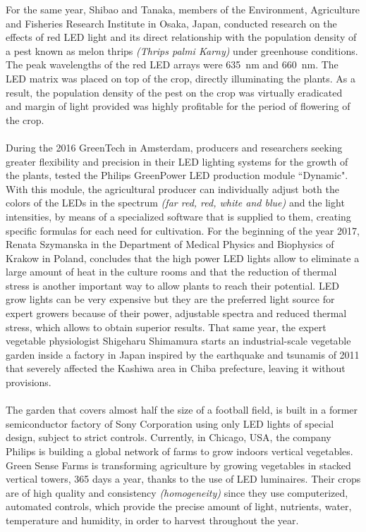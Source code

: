 \documentclass[letterpaper,12pt,twoside]{articleingud}
\begin{document}
For the same year, Shibao and Tanaka, members of the Environment, Agriculture and Fisheries Research Institute in Osaka, Japan, conducted research on the effects of red LED light and its direct relationship with the population density of a pest known as melon thrips \textit{(Thrips palmi Karny)} under greenhouse conditions. The peak wavelengths of the red LED arrays were \SI{635}{\nano\metre} and \SI{660}{\nano\metre}. The LED matrix was placed on top of the crop, directly illuminating the plants. As a result, the population density of the pest on the crop was virtually eradicated and margin of light provided was highly profitable for the period of flowering of the crop.\cite{Shibao}
\\\\
During the 2016 GreenTech in Amsterdam, producers and researchers seeking greater flexibility and precision in their LED lighting systems for the growth of the plants, tested the Philips GreenPower LED production module ``Dynamic". With this module, the agricultural producer can individually adjust both the colors of the LEDs in the spectrum \textit{(far red, red, white and blue)} and the light intensities, by means of a specialized software that is supplied to them, creating specific formulas for each need for cultivation.
For the beginning of the year 2017, Renata Szymanska in the Department of Medical Physics and Biophysics of Krakow in Poland, concludes that the high power LED lights allow to eliminate a large amount of heat in the culture rooms and that the reduction of thermal stress is another important way to allow plants to reach their potential. LED grow lights can be very expensive but they are the preferred light source for expert growers because of their power, adjustable spectra and reduced thermal stress, which allows to obtain superior results.\cite{estresTermico} 
That same year, the expert vegetable physiologist Shigeharu Shimamura starts an industrial-scale vegetable garden inside a factory in Japan inspired by the earthquake and tsunamis of 2011 that severely affected the Kashiwa area in Chiba prefecture, leaving it without provisions. \\\\
The garden that covers almost half the size of a football field, is built in a former semiconductor factory of Sony Corporation using only LED lights of special design, subject to strict controls.
Currently, in Chicago, USA, the company Philips is building a global network of farms to grow indoors vertical vegetables. Green Sense Farms is transforming agriculture by growing vegetables in stacked vertical towers, 365 days a year, thanks to the use of LED luminaires. Their crops are of high quality and consistency \textit{(homogeneity)} since they use computerized, automated controls, which provide the precise amount of light, nutrients, water, temperature and humidity, in order to harvest throughout the year.
\end{document}
